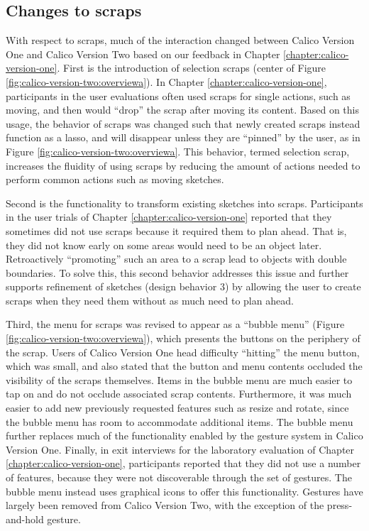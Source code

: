 \subsection{Changes to scraps}

With respect to scraps, much of the interaction changed between Calico Version One and Calico Version Two based on our feedback in Chapter \ref{chapter:calico-version-one}. First is the introduction of selection scraps (center of Figure \ref{fig:calico-version-two:overviewa}). In Chapter \ref{chapter:calico-version-one}, participants in the user evaluations often used scraps for single actions, such as moving, and then would ``drop'' the scrap after moving its content. Based on this usage, the behavior of scraps was changed such that newly created scraps instead function as a lasso, and will disappear unless they are ``pinned'' by the user, as in Figure \ref{fig:calico-version-two:overviewa}. This behavior, termed selection scrap, increases the fluidity of using scraps by reducing the amount of actions needed to perform common actions such as moving sketches. 

Second is the functionality to transform existing sketches into scraps. Participants in the user trials of Chapter \ref{chapter:calico-version-one} reported that they sometimes did not use scraps because it required them to plan ahead. That is, they did not know early on some areas would need to be an object later. Retroactively ``promoting'' such an area to a scrap lead to objects with double boundaries. To solve this, this second behavior addresses this issue and further supports refinement of sketches (design behavior 3) by allowing the user to create scraps when they need them without as much need to plan ahead. 

Third, the menu for scraps was revised to appear as a ``bubble menu'' (Figure \ref{fig:calico-version-two:overviewa}), which presents the buttons on the periphery of the scrap. Users of Calico Version One head difficulty ``hitting'' the menu button, which was small, and also stated that the button and menu contents occluded the visibility of the scraps themselves. Items in the bubble menu are much easier to tap on and do not occlude associated scrap contents. Furthermore, it was much easier to add new previously requested features such as resize and rotate, since the bubble menu has room to accommodate additional items. The bubble menu further replaces much of the functionality enabled by the gesture system in Calico Version One. Finally, in exit interviews for the laboratory evaluation of Chapter \ref{chapter:calico-version-one}, participants reported that they did not use a number of features, because they were not discoverable through the set of gestures. The bubble menu instead uses graphical icons to offer this functionality. Gestures have largely been removed from Calico Version Two, with the exception of the press-and-hold gesture.

